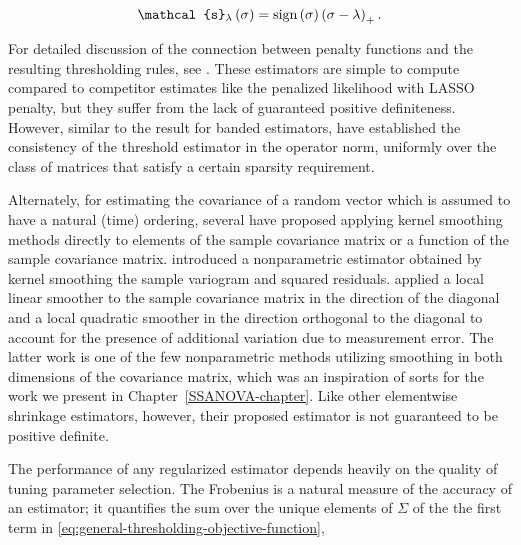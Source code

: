 \begin{equation} 
\mathcal{s}_\lambda\left( \sigma \right) = \textup{sign}\left(\sigma\right) \left(\sigma  - \lambda\right)_+.
\end{equation}

\noindent
For detailed discussion of the connection between penalty functions and the resulting thresholding rules, see \cite{antoniadis2001regularization}. These estimators are simple to compute compared to competitor estimates like the penalized likelihood with LASSO penalty, but they suffer from the lack of guaranteed positive definiteness. However, similar to the result for banded estimators, \cite{bickel2008covariance} have established the consistency of the threshold estimator in the operator norm, uniformly over the class of matrices that satisfy a certain sparsity requirement. 


\bigskip

Alternately, for estimating the covariance of a random vector which is assumed to have a natural (time) ordering, several have proposed applying kernel smoothing methods directly to elements of the sample covariance matrix or a function of the sample covariance matrix. \cite{zeger1994semiparametric} introduced a nonparametric estimator obtained by kernel smoothing the sample variogram and squared residuals.  \cite{yao2005functional} applied a local linear smoother to the sample covariance matrix in the direction of the diagonal and a local quadratic smoother in the direction orthogonal to the diagonal to account for the presence of additional variation due to measurement error. The latter work is one of the few nonparametric methods utilizing smoothing in both dimensions of the covariance matrix, which was an inspiration of sorts for the work we present in Chapter~\ref{SSANOVA-chapter}. Like other elementwise shrinkage estimators, however, their proposed estimator is not guaranteed to be positive definite. 

\bigskip

The performance of any regularized estimator depends heavily on the quality of tuning parameter selection. The Frobenius is a natural measure of the accuracy of an estimator; it quantifies the sum over the unique elements of $\Sigma$ of the the first term in \ref{eq:general-thresholding-objective-function}, 

